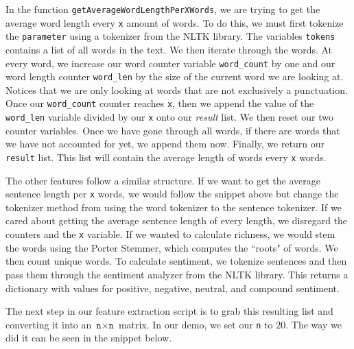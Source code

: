 \documentclass[runningheads]{llncs}
\begin{document}
In the function \texttt{getAverageWordLengthPerXWords}, we are trying to get the average word length every \texttt{x} amount of words. To do this, we must first tokenize the \texttt{parameter} using a tokenizer from the NLTK library. The variables \texttt{tokens} contains a list of all words in the text. We then iterate through the words. At every word, we increase our word counter variable \texttt{word\_count} by one and our word length counter \texttt{word\_len} by the size of the current word we are looking at. Notices that we are only looking at words that are not exclusively a punctuation. Once our \texttt{word\_count} counter reaches \texttt{x}, then we append the value of the \texttt{word\_len} variable divided by our \texttt{x} onto our \textit{result} list. We then reset our two counter variables. Once we have gone through all words, if there are words that we have not accounted for yet, we append them now. Finally, we return our \texttt{result} list. This list will contain the average length of words every \texttt{x} words. 

The other features follow a similar structure. If we want to get the average sentence length per \texttt{x} words, we would follow the snippet above but change the tokenizer method from using the word tokenizer to the sentence tokenizer. If we cared about getting the average sentence length of every length, we disregard the counters and the \texttt{x} variable. If we wanted to calculate richness, we would stem the words using the Porter Stemmer, which computes the ``roots" of words. We then count unique words. To calculate sentiment, we tokenize sentences and then pass them through the sentiment analyzer from the NLTK library. This returns a dictionary with values for positive, negative, neutral, and compound sentiment.

The next step in our feature extraction script is to grab this resulting list and converting it into an $\texttt{n} \times \texttt{n}$ matrix. In our demo, we set our \texttt{n} to $20$. The way we did it can be seen in the snippet below.

%
\end{document}
